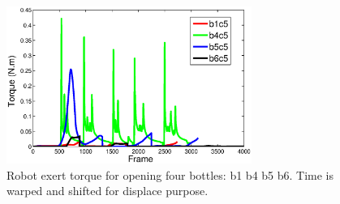 \begin{figure}
  \centering
  \includegraphics[width=8cm]{./fig/rb1b4b5b6_time_T.eps}
  \caption{ \scriptsize{Robot exert torque for opening four bottles: b1 b4 b5 b6. Time is warped and shifted for displace purpose.}
}
\label{fig:demo_b1b4b5b6}
\end{figure}


